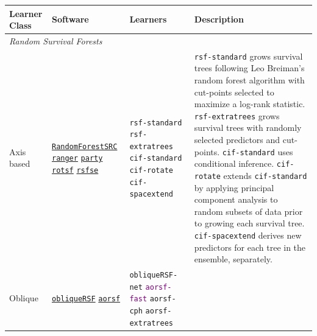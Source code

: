 \documentclass[12pt]{article}\usepackage[]{graphicx}\usepackage[]{xcolor}
\begin{document}
\begin{landscape}
\begin{table}[h!]
\centering
\begin{tabular}{p{2cm} | p{3cm} p{4cm} p{12cm}}
 \hline
 Learner Class & Software & Learners & Description \\ [0.5ex]
 \hline\hline
 \multicolumn{3}{l}{\textit{Random Survival Forests}}\\
 \hline\hline

 Axis based &

 \href{https://www.randomforestsrc.org/index.html}{\texttt{RandomForestSRC}} \newline
 \href{https://CRAN.R-project.org/package=ranger}{\texttt{ranger}} \newline
 \href{http://party.r-forge.r-project.org/}{\texttt{party}} \newline
 \href{https://github.com/whcsu/rotsf}{\texttt{rotsf}} \newline
 \href{https://github.com/whcsu/rsfse}{\texttt{rsfse}} &

 \texttt{rsf-standard} \newline
 \texttt{rsf-extratrees} \newline
 \texttt{cif-standard} \newline
 \texttt{cif-rotate} \newline
 \texttt{cif-spacextend} &

 \texttt{rsf-standard} grows survival trees following Leo Breiman's random forest algorithm with cut-points selected to maximize a log-rank statistic. \texttt{rsf-extratrees} grows survival trees with randomly selected predictors and cut-points. \texttt{cif-standard} uses conditional inference. \texttt{cif-rotate} extends \texttt{cif-standard} by applying principal component analysis to random subsets of data prior to growing each survival tree. \texttt{cif-spacextend} derives new predictors for each tree in the ensemble, separately. \\ \hline


 Oblique &


 \href{https://CRAN.R-project.org/package=obliqueRSF}{\texttt{obliqueRSF}} \newline
 \href{https://bcjaeger.github.io/aorsf/}{\texttt{aorsf}} &

 \texttt{obliqueRSF-net} \newline
 \textcolor{purple}{\texttt{aorsf-fast}} \newline
 \texttt{aorsf-cph} \newline
 \texttt{aorsf-extratrees} &



\end{tabular}
\end{table}
\end{landscape}
\end{document}
